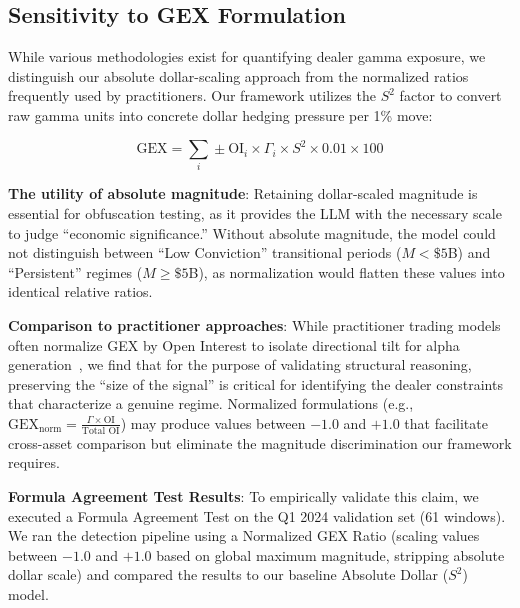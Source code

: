 \subsection{Sensitivity to GEX Formulation}

\vspace{0.2cm}

While various methodologies exist for quantifying dealer gamma exposure, we distinguish our absolute dollar-scaling approach from the normalized ratios frequently used by practitioners. Our framework utilizes the $S^2$ factor to convert raw gamma units into concrete dollar hedging pressure per 1\% move:

\begin{equation}
\text{GEX} = \sum_i \pm \text{OI}_i \times \Gamma_i \times S^2 \times 0.01 \times 100
\end{equation}

\vspace{0.2cm}

\noindent\textbf{The utility of absolute magnitude}: Retaining dollar-scaled magnitude is essential for obfuscation testing, as it provides the LLM with the necessary scale to judge ``economic significance.'' Without absolute magnitude, the model could not distinguish between ``Low Conviction'' transitional periods ($M < \$5$B) and ``Persistent'' regimes ($M \geq \$5$B), as normalization would flatten these values into identical relative ratios.

\vspace{0.2cm}

\noindent\textbf{Comparison to practitioner approaches}: While practitioner trading models often normalize GEX by Open Interest to isolate directional tilt for alpha generation~\citep{anderegg2022impact,spotgamma2021}, we find that for the purpose of validating structural reasoning, preserving the ``size of the signal'' is critical for identifying the dealer constraints that characterize a genuine regime. Normalized formulations (e.g., $\text{GEX}_{\text{norm}} = \frac{\Gamma \times \text{OI}}{\text{Total OI}}$) may produce values between $-1.0$ and $+1.0$ that facilitate cross-asset comparison but eliminate the magnitude discrimination our framework requires.

\vspace{0.2cm}

\noindent\textbf{Formula Agreement Test Results}: To empirically validate this claim, we executed a Formula Agreement Test on the Q1 2024 validation set (61 windows). We ran the detection pipeline using a Normalized GEX Ratio (scaling values between $-1.0$ and $+1.0$ based on global maximum magnitude, stripping absolute dollar scale) and compared the results to our baseline Absolute Dollar ($S^2$) model.

